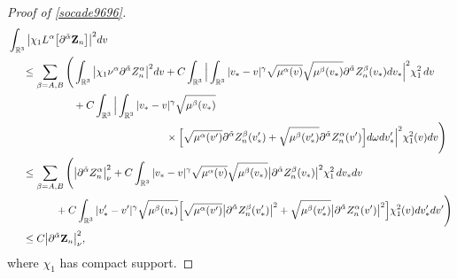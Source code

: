 \documentclass[reqno]{amsart}
\numberwithin{equation}{section}
\numberwithin{equation}{section}
\begin{document}
\begin{proof}[Proof of \eqref{socade9696}]
		\begin{align*}
			&\int_{\mathbb{R}^{3}} \big|\chi_1 L^{\alpha}\big[\partial^{\tilde{\alpha}} \mathbf{Z}_n\big]\big|^2 dv \\
			&\hspace{0.5cm}\leq \sum_{\beta=A,B} \Bigg(\int_{\mathbb{R}^{3}} \big|\chi_1 \nu^{\alpha} \partial^{\tilde{\alpha}} Z^{\alpha}_n\big|^2 dv + C \int_{\mathbb{R}^{3}} \Big| \int_{\mathbb{R}^{3}} |v_* - v|^\gamma \sqrt{\mu^\alpha(v)} \sqrt{\mu^\beta(v_*)}\partial^{\tilde{\alpha}} Z_n^\beta(v_*)  dv_* \Big|^2 \chi_1^2\, dv \\
			&\hspace{2.2cm} + C \int_{\mathbb{R}^{3}} \Big| \int_{\mathbb{R}^{3}} |v_* - v|^\gamma \sqrt{\mu^\beta(v_*)}\\
			&\hspace{5.3cm}\times \Big[ \sqrt{\mu^\alpha(v')} \partial^{\tilde{\alpha}} Z^{\beta}_n(v_*') + \sqrt{\mu^\beta(v_*')} \partial^{\tilde{\alpha}} Z_n^{\alpha}(v') \Big] d\omega dv_*' \Big|^2 \chi_1^2(v) dv \Bigg) \\
		&\hspace{0.5cm}\leq \sum_{\beta=A,B} \Bigg( \big|\partial^{\tilde{\alpha}} Z^{\alpha}_{n}\big|_{\nu}^{2} + C \int_{\mathbb{R}^{3}} |v_* - v|^{\gamma} \sqrt{\mu^\alpha(v)} \sqrt{\mu^\beta(v_*)}\big|\partial^{\tilde{\alpha}} Z_n^\beta(v_*)\big|^{2} \chi_{1}^{2} \,dv_*dv \\
		&\hspace{1.6cm}+ C \int_{\mathbb{R}^{3}} |v_*' - v'|^{\gamma} \sqrt{\mu^\beta(v_*)} \Big[ \sqrt{\mu^\alpha(v')}\big|\partial^{\tilde{\alpha}} Z^{\beta}_n(v_*')\big|^{2} + \sqrt{\mu^\beta(v_*')}\big|\partial^{\tilde{\alpha}} Z_n^{\alpha}(v')\big|^{2}\Big] \chi_{1}^{2}(v) dv_*'dv' \Bigg)\\
		&\hspace{0.5cm}\leq C  \big|\partial^{\tilde{\alpha}} \mathbf{Z}_{n}\big|_{\nu}^{2},
		\end{align*}
		where $\chi_{1}$ has compact support. 
		

\end{proof}
\end{document}
